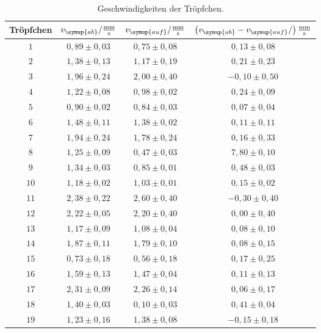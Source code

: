 \begin{table}
  \centering
  \caption{Geschwindigkeiten der Tröpfchen.}
  \label{tab:Geschwindigkeit}
  \begin{tabular}{c | c c c}
    \toprule
    Tröpfchen & $v_{\symup{ab}}/\frac{\si{\milli\meter}}{\si{\second}}$ & $v_{\symup{auf}}/\frac{\si{\milli\meter}}{\si{\second}}$ &
    $\left(v_{\symup{ab}} - v_{\symup{auf}}/\right)\frac{\si{\milli\meter}}{\si{\second}}$ \\
    \midrule
    $  1 $ & $ 0,89 \pm 0,03 $ & $ 0,75 \pm 0,08 $ & $ 0,13 \pm 0,08 $ \\
    $  2 $ & $ 1,38 \pm 0,13 $ & $ 1,17 \pm 0,19 $ & $ 0,21 \pm 0,23 $ \\
    $  3 $ & $ 1,96 \pm 0,24 $ & $ 2,00 \pm 0,40 $ & $-0,10 \pm 0,50 $ \\
    $  4 $ & $ 1,22 \pm 0,08 $ & $ 0,98 \pm 0,02 $ & $ 0,24 \pm 0,09 $ \\
    $  5 $ & $ 0,90 \pm 0,02 $ & $ 0,84 \pm 0,03 $ & $ 0,07 \pm 0,04 $ \\
    $  6 $ & $ 1,48 \pm 0,11 $ & $ 1,38 \pm 0,02 $ & $ 0,11 \pm 0,11 $  \\
    $  7 $ & $ 1,94 \pm 0,24 $ & $ 1,78 \pm 0,24 $ & $ 0,16 \pm 0,33 $  \\
    $  8 $ & $ 1,25 \pm 0,09 $ & $ 0,47 \pm 0,03 $ & $ 7,80 \pm 0,10 $  \\
    $  9 $ & $ 1,34 \pm 0,03 $ & $ 0,85 \pm 0,01 $ & $ 0,48 \pm 0,03 $  \\
    $ 10 $ & $ 1,18 \pm 0,02 $ & $ 1,03 \pm 0,01 $ & $ 0,15 \pm 0,02 $  \\
    $ 11 $ & $ 2,38 \pm 0,22 $ & $ 2,60 \pm 0,40 $ & $-0,30 \pm 0,40 $ \\
    $ 12 $ & $ 2,22 \pm 0,05 $ & $ 2,20 \pm 0,40 $ & $ 0,00 \pm 0,40 $ \\
    $ 13 $ & $ 1,17 \pm 0,09 $ & $ 1,08 \pm 0,04 $ & $ 0,08 \pm 0,10 $ \\
    $ 14 $ & $ 1,87 \pm 0,11 $ & $ 1,79 \pm 0,10 $ & $ 0,08 \pm 0,15 $ \\
    $ 15 $ & $ 0,73 \pm 0,18 $ & $ 0,56 \pm 0,18 $ & $ 0,17 \pm 0,25 $ \\
    $ 16 $ & $ 1,59 \pm 0,13 $ & $ 1,47 \pm 0,04 $ & $ 0,11 \pm 0,13 $ \\
    $ 17 $ & $ 2,31 \pm 0,09 $ & $ 2,26 \pm 0,14 $ & $ 0,06 \pm 0,17 $ \\
    $ 18 $ & $ 1,40 \pm 0,03 $ & $ 0,10 \pm 0,03 $ & $ 0,41 \pm 0,04 $ \\
    $ 19 $ & $ 1,23 \pm 0,16 $ & $ 1,38 \pm 0,08 $ & $-0,15 \pm 0,18 $ \\

\end{tabular}
\end{table}
